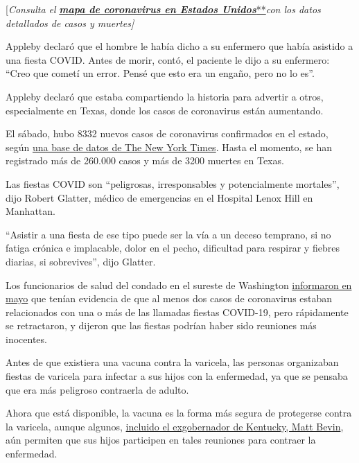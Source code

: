 {[}\emph{Consulta el}
\textbf{\href{https://www.nytimes3xbfgragh.onion/es/interactive/2020/espanol/mundo/coronavirus-en-estados-unidos.html}{\emph{mapa
de coronavirus en Estados
Unidos}}}\href{https://www.nytimes3xbfgragh.onion/es/interactive/2020/espanol/mundo/coronavirus-en-estados-unidos.html}{**}\emph{con
los datos detallados de casos y muertes{]}}

Appleby declaró que el hombre le había dicho a su enfermero que había
asistido a una fiesta COVID. Antes de morir, contó, el paciente le dijo
a su enfermero: ``Creo que cometí un error. Pensé que esto era un
engaño, pero no lo es''.

Appleby declaró que estaba compartiendo la historia para advertir a
otros, especialmente en Texas, donde los casos de coronavirus están
aumentando.

El sábado, hubo 8332 nuevos casos de coronavirus confirmados en el
estado, según
\href{https://www.nytimes3xbfgragh.onion/interactive/2020/us/texas-coronavirus-cases.html}{una
base de datos de The New York Times}. Hasta el momento, se han
registrado más de 260.000 casos y más de 3200 muertes en Texas.

Las fiestas COVID son ``peligrosas, irresponsables y potencialmente
mortales'', dijo Robert Glatter, médico de emergencias en el Hospital
Lenox Hill en Manhattan.

``Asistir a una fiesta de ese tipo puede ser la vía a un deceso
temprano, si no fatiga crónica e implacable, dolor en el pecho,
dificultad para respirar y fiebres diarias, si sobrevives'', dijo
Glatter.

Los funcionarios de salud del condado en el sureste de Washington
\href{https://www.nytimes3xbfgragh.onion/2020/05/06/us/coronavirus-covid-parties.html}{informaron
en mayo} que tenían evidencia de que al menos dos casos de coronavirus
estaban relacionados con una o más de las llamadas fiestas COVID-19,
pero rápidamente se retractaron, y dijeron que las fiestas podrían haber
sido reuniones más inocentes.

Antes de que existiera una vacuna contra la varicela, las personas
organizaban fiestas de varicela para infectar a sus hijos con la
enfermedad, ya que se pensaba que era más peligroso contraerla de
adulto.

Ahora que está disponible, la vacuna es la forma más segura de
protegerse contra la varicela, aunque algunos,
\href{https://www.nytimes3xbfgragh.onion/2019/03/21/us/kentucky-governor-chickenpox.html}{incluido
el exgobernador de Kentucky, Matt Bevin}, aún permiten que sus hijos
participen en tales reuniones para contraer la enfermedad.

